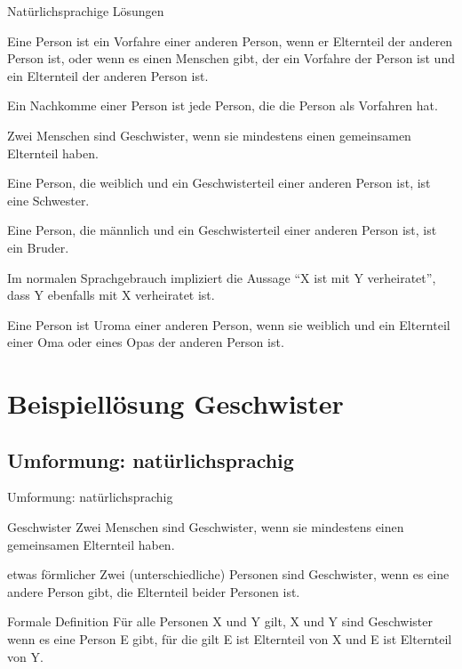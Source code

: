 \documentclass[pdf]{beamer}
\begin{document}
	\begin{frame}[allowframebreaks]{Natürlichsprachige Lösungen}
		\begin{description}[Nachkomme]
				\item[Vorfahre] Eine Person ist ein Vorfahre einer anderen Person,
				wenn er Elternteil der anderen Person ist, oder wenn es einen Menschen gibt,
				der ein Vorfahre der Person ist und ein Elternteil der anderen Person ist.
				\item[Nachkomme] Ein Nachkomme einer Person ist jede Person, die die Person als Vorfahren hat.
				\item[Geschwister] Zwei Menschen sind Geschwister, wenn sie mindestens einen gemeinsamen Elternteil haben.
				\item[Schwester] Eine Person, die weiblich und ein Geschwisterteil einer anderen Person ist, ist eine Schwester.
				\item[Bruder] Eine Person, die männlich und ein Geschwisterteil einer anderen Person ist, ist ein Bruder.
				\item[Eheleute] Im normalen Sprachgebrauch impliziert die Aussage \enquote{X ist mit Y verheiratet},
				dass Y ebenfalls mit X verheiratet ist.
				\item[Uroma] Eine Person ist Uroma einer anderen Person,
				wenn sie weiblich und ein Elternteil einer Oma oder eines Opas der anderen Person ist.	

			\end{description}
	\end{frame}
	


	\section{Beispiellösung Geschwister}
	
	\subsection{Umformung: natürlichsprachig}
	
	\begin{frame}{Umformung: natürlichsprachig}
		\begin{exampleblock}{Geschwister}
			Zwei Menschen sind Geschwister, wenn sie mindestens einen gemeinsamen Elternteil haben.
		\end{exampleblock} \pause

		\begin{block}{etwas förmlicher}
			Zwei (unterschiedliche) Personen sind Geschwister,
			wenn es eine andere Person gibt, die Elternteil beider Personen ist.
		\end{block} \pause

		\begin{alertblock}{Formale Definition}
			Für alle Personen
			X und Y gilt,
			X und Y sind Geschwister
			wenn
			es eine Person E gibt, für die gilt
			E ist Elternteil von X
			und
			E ist Elternteil von Y.
		\end{alertblock}

	\end{frame}
	
\end{document}
